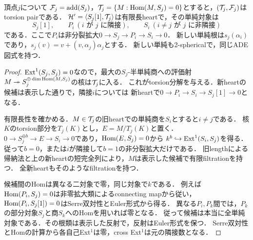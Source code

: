 \begin{lemma}[一つの単純対象でのtilt]\label{lem:simpletilt}
頂点$j$について
$\mathcal F_j=\operatorname{add}(S_j)$，$\mathcal T_j=\{M:\operatorname{Hom}(M,S_j)=0\}$とすると，$(\mathcal T_j,\mathcal F_j)$はtorsion pairである．
$\mathcal H'=\langle S_j[1],\mathcal T_j\rangle$は有限長heartで，その単純対象は
\[
 S_j[1],\qquad
 P_i\ (i\text{ が }j\text{ に隣接}),\qquad
 S_i\ (i\ne j\text{ が }j\text{ に非隣接})
\]
である．ここで$P_i$は非分裂拡大$0\to S_j\to P_i\to S_i\to0$．
新しい単純根は$s_j(\alpha_i)$であり，$s_j(v)=v+(v,\alpha_j)\alpha_j$とする．
新しい単純も2-sphericalで，同じADE図式を持つ．
\end{lemma}
\begin{proof}
$\operatorname{Ext}^1(S_j,S_j)=0$なので，最大の$S_j$-半単純商への評価射
$M\twoheadrightarrow S_j^{\oplus\dim\operatorname{Hom}(M,S_j)}$の核は$\mathcal T_j$に入る．
これがtorsion分解を与える．新heartの候補は表示した通りで，隣接$i$については
新heartで$0\to P_i\to S_i\to S_j[1]\to0$となる．

有限長性を確かめる．$M\in\mathcal T_j$の旧heartでの単純商を$S_i$とすると$i\ne j$である．
核$K$のtorsion部分を$T_j(K)$とし，$E=M/T_j(K)$と置く．
$0\to S_j^{\oplus b}\to E\to S_i\to0$であり，$\operatorname{Hom}(E,S_j)=0$から
$k^b\hookrightarrow\operatorname{Ext}^1(S_i,S_j)$を得る．従って$b=0$，または$i$が隣接して$b=1$の非分裂拡大だけである．
旧lengthによる帰納法と上の新heartの短完全列により，$M$は表示した候補で有限filtrationを持つ．
全新heartもそのようなfiltrationを持つ．

候補間のHomは異なる二対象で零，同じ対象で$k$である．
例えば$\operatorname{Hom}(P_i,S_j)=0$は非零拡大類によるconnecting mapから従い，
$\operatorname{Hom}(P_i,S_j[1])=0$はSerre双対性とEuler形式から得る．
異なる$P_i,P_k$間では，$P_k$の部分対象$S_j$と商$S_k$へのHomを用いれば零となる．
従って候補は本当に全単純対象である．その根類は表示した反射で，反射はEuler形式を保つ．
Serre双対性とHomの計算から各自己Ext$^1$は零，cross Ext$^1$は元の隣接数となる．
\end{proof}


